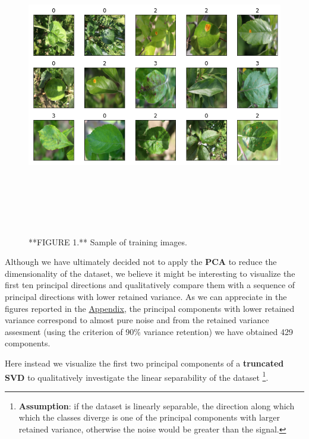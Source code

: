 \documentclass[]{article}
\begin{document}
\begin{figure}

{\centering \includegraphics[width=800px,height=500]{Images/InputImages} 

}

\caption{**FIGURE 1.** Sample of training images.}\label{fig:input-images}
\end{figure}

Although we have ultimately decided not to apply the \textbf{PCA} to
reduce the dimensionality of the dataset, we believe it might be
interesting to visualize the first ten principal directions and
qualitatively compare them with a sequence of principal directions with
lower retained variance. As we can appreciate in the figures reported in
the \protect\hyperlink{pca}{Appendix}, the principal components with
lower retained variance correspond to almost pure noise and from the
retained variance assesment (using the criterion of 90\% variance
retention) we have obtained 429 components.

Here instead we visualize the first two principal components of a
\textbf{truncated SVD} to qualitatively investigate the linear
separability of the dataset \footnote{\textbf{Assumption}: if the
  dataset is linearly separable, the direction along which which the
  classes diverge is one of the principal components with larger
  retained variance, otherwise the noise would be greater than the
  signal.}.
\end{document}
